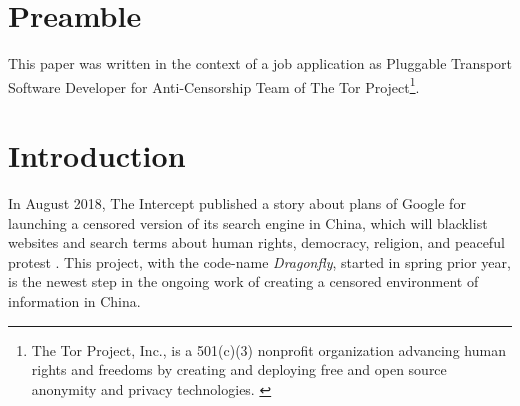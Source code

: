 \documentclass[sigconf, screen]{acmart}
\begin{document}
\maketitle

\section*{Preamble}
\label{s:preamble}
This paper was written in the context of a job application as Pluggable Transport Software Developer for Anti-Censorship Team of The Tor Project\footnote{The Tor Project, Inc., is a 501(c)(3) nonprofit organization advancing human rights and freedoms by creating and deploying free and open source anonymity and privacy technologies. \cite{JobDes}}.
\section{Introduction}
\label{s:introduction}
In August 2018, The Intercept published a story about plans of Google for launching a censored version of its search engine in China, which will blacklist websites and search terms about human rights, democracy, religion, and peaceful protest \cite{Dragonfly}. This project, with the code-name \textit{Dragonfly}, started in spring prior year, is the newest step in the ongoing work of creating a censored environment of information in China.
\end{document}
